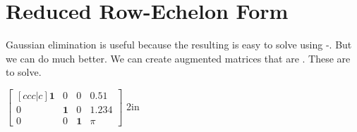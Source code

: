 \section{Reduced Row-Echelon Form}

Gaussian elimination is useful because the resulting   
is easy to solve using -.
But we can do much better. 
We can create augmented matrices that are . 
These are   to solve.

{
    $
    \begin{bmatrix}[ccc|c]
        \boldsymbol{1} & 0 & 0 & 0.51 \\
        0 & \boldsymbol{1} & 0 & 1.234 \\
        0 & 0 & \boldsymbol{1} & \pi
    \end{bmatrix}
    $
}
{2in}